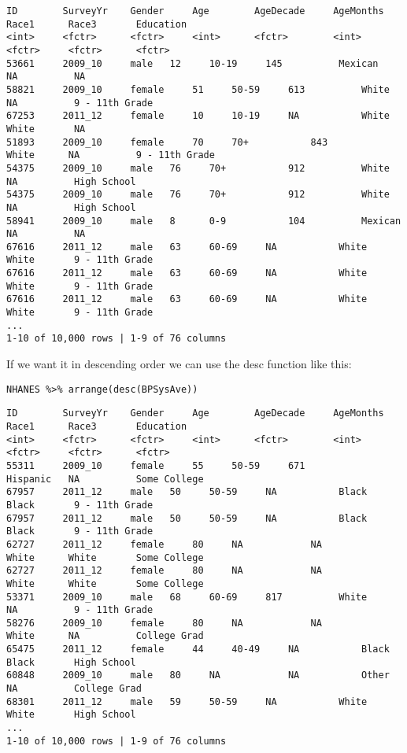 \documentclass[]{article}
\begin{document}
\begin{verbatim}
ID        SurveyYr    Gender     Age        AgeDecade     AgeMonths    Race1      Race3       Education
<int>     <fctr>      <fctr>     <int>      <fctr>        <int>        <fctr>     <fctr>      <fctr>
53661     2009_10     male   12     10-19     145          Mexican    NA          NA    
58821     2009_10     female     51     50-59     613          White      NA          9 - 11th Grade    
67253     2011_12     female     10     10-19     NA           White      White       NA    
51893     2009_10     female     70     70+           843          White      NA          9 - 11th Grade    
54375     2009_10     male   76     70+           912          White      NA          High School   
54375     2009_10     male   76     70+           912          White      NA          High School   
58941     2009_10     male   8      0-9           104          Mexican    NA          NA    
67616     2011_12     male   63     60-69     NA           White      White       9 - 11th Grade    
67616     2011_12     male   63     60-69     NA           White      White       9 - 11th Grade    
67616     2011_12     male   63     60-69     NA           White      White       9 - 11th Grade    
...
1-10 of 10,000 rows | 1-9 of 76 columns
\end{verbatim}

If we want it in descending order we can use the desc function like
this:

\begin{verbatim}
NHANES %>% arrange(desc(BPSysAve))
\end{verbatim}

\begin{verbatim}
ID        SurveyYr    Gender     Age        AgeDecade     AgeMonths    Race1      Race3       Education
<int>     <fctr>      <fctr>     <int>      <fctr>        <int>        <fctr>     <fctr>      <fctr>
55311     2009_10     female     55     50-59     671          Hispanic   NA          Some College  
67957     2011_12     male   50     50-59     NA           Black      Black       9 - 11th Grade    
67957     2011_12     male   50     50-59     NA           Black      Black       9 - 11th Grade    
62727     2011_12     female     80     NA            NA           White      White       Some College  
62727     2011_12     female     80     NA            NA           White      White       Some College  
53371     2009_10     male   68     60-69     817          White      NA          9 - 11th Grade    
58276     2009_10     female     80     NA            NA           White      NA          College Grad  
65475     2011_12     female     44     40-49     NA           Black      Black       High School   
60848     2009_10     male   80     NA            NA           Other      NA          College Grad  
68301     2011_12     male   59     50-59     NA           White      White       High School   
...
1-10 of 10,000 rows | 1-9 of 76 columns
\end{verbatim}
\end{document}
